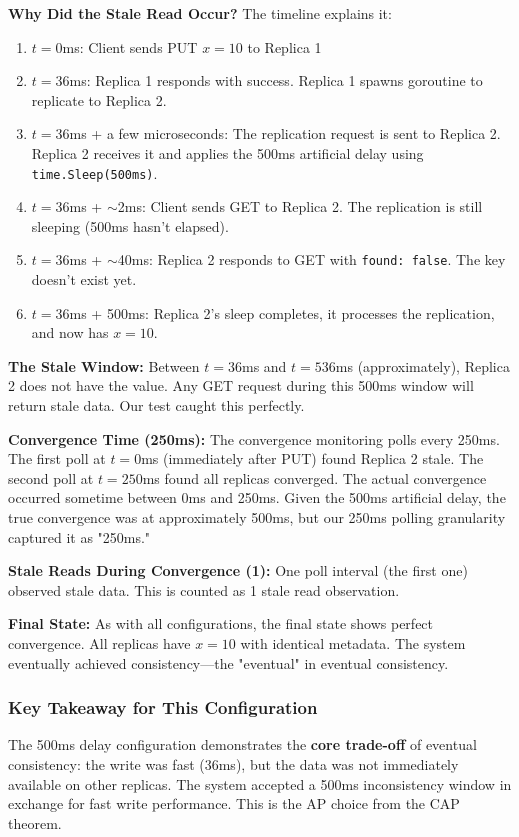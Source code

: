 \documentclass[10pt,a4paper]{article}
\begin{document}
\textbf{Why Did the Stale Read Occur?} The timeline explains it:
\begin{enumerate}
    \item $t=0$ms: Client sends PUT $x=10$ to Replica 1
    \item $t=36$ms: Replica 1 responds with success. Replica 1 spawns goroutine to replicate to Replica 2.
    \item $t=36$ms + a few microseconds: The replication request is sent to Replica 2. Replica 2 receives it and applies the 500ms artificial delay using \texttt{time.Sleep(500ms)}.
    \item $t=36$ms + $\sim$2ms: Client sends GET to Replica 2. The replication is still sleeping (500ms hasn't elapsed).
    \item $t=36$ms + $\sim$40ms: Replica 2 responds to GET with \texttt{found: false}. The key doesn't exist yet.
    \item $t=36$ms + 500ms: Replica 2's sleep completes, it processes the replication, and now has $x=10$.
\end{enumerate}

\textbf{The Stale Window:} Between $t=36$ms and $t=536$ms (approximately), Replica 2 does not have the value. Any GET request during this 500ms window will return stale data. Our test caught this perfectly.

\textbf{Convergence Time (250ms):} The convergence monitoring polls every 250ms. The first poll at $t=0$ms (immediately after PUT) found Replica 2 stale. The second poll at $t=250$ms found all replicas converged. The actual convergence occurred sometime between 0ms and 250ms. Given the 500ms artificial delay, the true convergence was at approximately 500ms, but our 250ms polling granularity captured it as "250ms."

\textbf{Stale Reads During Convergence (1):} One poll interval (the first one) observed stale data. This is counted as 1 stale read observation.

\textbf{Final State:} As with all configurations, the final state shows perfect convergence. All replicas have $x=10$ with identical metadata. The system eventually achieved consistency---the "eventual" in eventual consistency.

\subsubsection{Key Takeaway for This Configuration}

The 500ms delay configuration demonstrates the \textbf{core trade-off} of eventual consistency: the write was fast (36ms), but the data was not immediately available on other replicas. The system accepted a 500ms inconsistency window in exchange for fast write performance. This is the AP choice from the CAP theorem.
\end{document}
